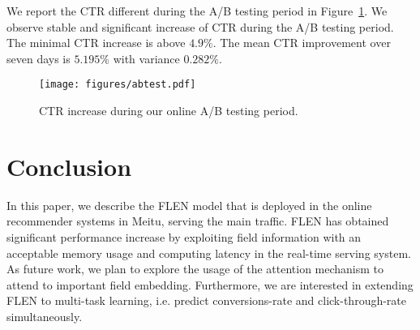 \documentclass[sigconf]{acmart}
\begin{document}
We report the CTR different during the A/B testing period in Figure~\ref{fig:online}. 
We observe stable and significant increase of CTR during the A/B testing period. 
The minimal CTR increase is above $4.9\%$. The mean CTR improvement over seven days is $5.195\%$ with variance $0.282\%$.
\begin{figure}[htbp]
\centering\texttt{[image: figures/abtest.pdf]}
\caption{CTR increase during our online A/B testing period.}
\label{fig:online}
\end{figure}

\section{Conclusion}
In this paper, we describe the FLEN model that is deployed in the online recommender systems in Meitu, serving the main traffic. FLEN has obtained significant performance increase by exploiting field information with an acceptable memory usage and computing latency in the real-time serving system. 
As future work, we plan to explore the usage of the attention mechanism to attend to important field embedding. Furthermore, we are interested in extending FLEN to  multi-task learning, i.e. predict conversions-rate and click-through-rate simultaneously. 
\end{document}
